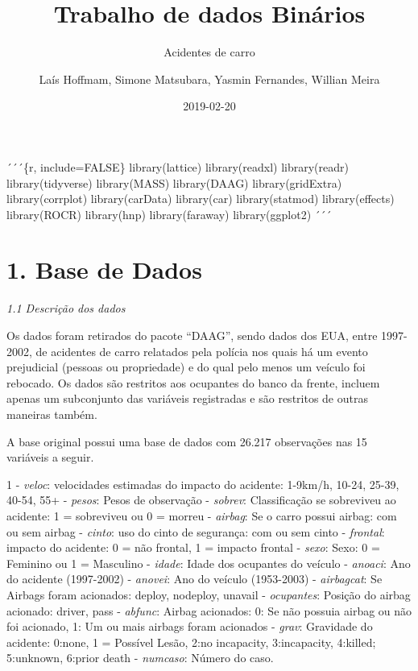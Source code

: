 \documentclass[]{article}
\title{Trabalho de dados Binários}
\subtitle{Acidentes de carro}
\author{Laís Hoffmam, Simone Matsubara, Yasmin Fernandes, Willian Meira}
\date{2019-02-20}
\begin{document}
\maketitle

´´´\{r, include=FALSE\} library(lattice) library(readxl) library(readr)
library(tidyverse) library(MASS) library(DAAG) library(gridExtra)
library(corrplot) library(carData) library(car) library(statmod)
library(effects) library(ROCR) library(hnp) library(faraway)
library(ggplot2) ´´´

\section{1. Base de Dados}\label{base-de-dados}

\emph{1.1 Descrição dos dados}

Os dados foram retirados do pacote ``DAAG'', sendo dados dos EUA, entre
1997-2002, de acidentes de carro relatados pela polícia nos quais há um
evento prejudicial (pessoas ou propriedade) e do qual pelo menos um
veículo foi rebocado. Os dados são restritos aos ocupantes do banco da
frente, incluem apenas um subconjunto das variáveis registradas e são
restritos de outras maneiras também.

A base original possui uma base de dados com 26.217 observações nas 15
variáveis a seguir.

1 - \emph{veloc}: velocidades estimadas do impacto do acidente: 1-9km/h,
10-24, 25-39, 40-54, 55+  - \emph{pesos}: Pesos de observação
 - \emph{sobrev}: Classificação se sobreviveu ao acidente: 1 =
sobreviveu ou 0 = morreu  - \emph{airbag}: Se o carro possui
airbag: com ou sem airbag  - \emph{cinto}: uso do cinto de
segurança: com ou sem cinto  - \emph{frontal}: impacto do
acidente: 0 = não frontal, 1 = impacto frontal  - \emph{sexo}:
Sexo: 0 = Feminino ou 1 = Masculino  - \emph{idade}: Idade dos
ocupantes do veículo  - \emph{anoaci}: Ano do acidente
(1997-2002)  - \emph{anovei}: Ano do veículo (1953-2003)
 - \emph{airbagcat}: Se Airbags foram acionados: deploy,
nodeploy, unavail  - \emph{ocupantes}: Posição do airbag
acionado: driver, pass  - \emph{abfunc}: Airbag acionados: 0:
Se não possuia airbag ou não foi acionado, 1: Um ou mais airbags foram
acionados  - \emph{grav}: Gravidade do acidente: 0:none, 1 =
Possível Lesão, 2:no incapacity, 3:incapacity, 4:killed; 5:unknown,
6:prior death  - \emph{numcaso}: Número do caso.
\end{document}
